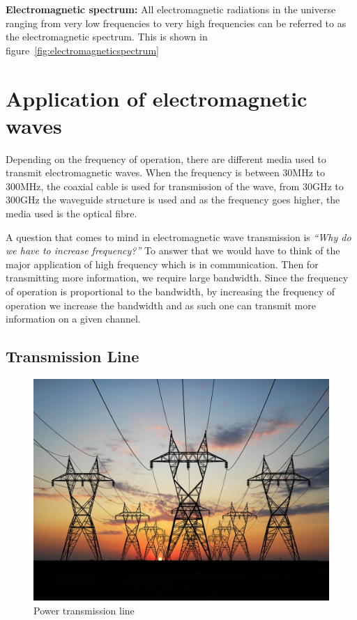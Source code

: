\textbf{Electromagnetic spectrum:} All electromagnetic radiations in the universe ranging from very low frequencies to very high frequencies can be referred to as the electromagnetic spectrum. This is shown in figure~\ref{fig:electromagneticspectrum}

\section{Application of electromagnetic waves}
Depending on the frequency of operation, there are different media used to transmit electromagnetic waves. When the frequency is between 30MHz to 300MHz, the coaxial cable is used for transmission of the wave, from 30GHz to 300GHz the waveguide structure is used and as the frequency goes higher, the media used is the optical fibre.

A question that comes to mind in electromagnetic wave transmission is \emph{\textquotedblleft Why do we have to increase frequency?\textquotedblright} \hspace{0.03in} To answer that we would have to think of the major application of high frequency which is in communication. Then for transmitting more information, we require large bandwidth. Since the frequency of operation is proportional to the bandwidth, by increasing the frequency of operation we increase the bandwidth and as such one can transmit more information on a given channel.

\subsection{Transmission Line}
\begin{figure}[h]
\centering
\includegraphics[scale=0.1]{./graphics/transmission2}
\caption{Power transmission line}
\end{figure}

